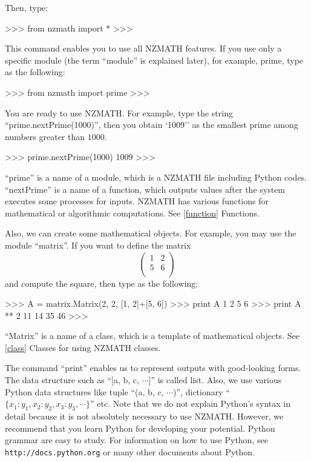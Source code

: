 Then, type:
\begin{ex}
>>> from nzmath import *
>>>
\end{ex}
This command enables you to use all NZMATH features.
If you use only a specific module (the term ``module'' is explained later), for example, prime, type as the following:
\begin{ex}
>>> from nzmath import prime
>>>
\end{ex}
You are ready to use NZMATH.
For example, type the string ``prime.nextPrime(1000)'', 
then you obtain `1009'' 
as the smallest prime among numbers greater than $1000$.
\begin{ex}
>>> prime.nextPrime(1000)
1009
>>>
\end{ex}
``prime'' is a name of a module, which is a NZMATH file including Python codes.
``nextPrime'' is a name of a function, which outputs values after the system executes some processes for inputs.
NZMATH has various functions for mathematical or algorithmic computations.
See \ref{function} Functions.

Also, we can create some mathematical objects.
For example, you may use the module ``matrix''.
If you want to define the matrix
\begin{equation*}
\left(
\begin{array}{rl}
1 & 2\\
5 & 6\\
\end{array}
\right)
\end{equation*}
and compute the square, then type as the following:
\begin{ex}
>>> A = matrix.Matrix(2, 2, [1, 2]+[5, 6])
>>> print A
1 2
5 6
>>> print A ** 2
11 14
35 46
>>>
\end{ex}
``Matrix'' is a name of a class, which is a template of mathematical objects.
See \ref{class} Classes for using NZMATH classes.

The command ``print'' enables us to represent outputs with good-looking forms.
The data structure such as ``[a, b, c, $\cdots$]'' is called list.
Also, we use various Python data structures like 
tuple ``(a, b, c, $\cdots$)'', 
dictionary ``$\{x_1:y_1, x_2:y_2, x_3:y_3, \cdots\}$'' etc.
Note that we do not explain Python's syntax in detail 
because it is not absolutely necessary to use NZMATH.
However, we recommend that you learn Python for developing your potential.
Python grammar are easy to study.
For information on how to use Python, 
see \verb+http://docs.python.org+ or many other documents about Python.
  
